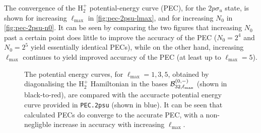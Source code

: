 \documentclass[draft]{article}
\newcommand{\lilf}[1]{\lstinline[style=ff]{#1}}
\begin{document}
The convergence of the $\mathrm{H}_{2}^{+}$ potential-energy curve (PEC), for
the $2p\sigma_{u}$ state, is shown for increasing $\ell_{\max}$ in
\autoref{fig:pec-2psu-lmax}, and for increasing $N_{0}$ in
\autoref{fig:pec-2psu-n0}.
It can be seen by comparing the two figures that increasing $N_{0}$ past a
certain point does little to improve the accuracy of the PEC ($N_{0} = 2^{4}$
and $N_{0} = 2^{5}$ yield essentially identical PECs), while on the other hand,
increasing $\ell_{\max}$ continues to yield improved accuracy of the PEC (at
least up to $\ell_{\max} = 5$).

\begin{figure}[h]
  \centering
  \caption
  {
    The potential energy curves, for $\ell_{\max} = 1, 3, 5$, obtained by
    diagonalising the $\mathrm{H}_{2}^{+}$ Hamiltonian in the bases
    $\mathcal{B}_{32, \ell_{\max}}^{(0, -)}$ (shown in black-to-red), are
    compared with the accuracte potential energy curve provided in
    \lilf{PEC.2psu} (shown in blue).
    It can be seen that calculated PECs do converge to the accurate PEC, with a
    non-negligble increase in accuracy with increasing $\ell_{\max}$.
  }
  \label{fig:pec-2psu-lmax}
\end{figure}
\end{document}
